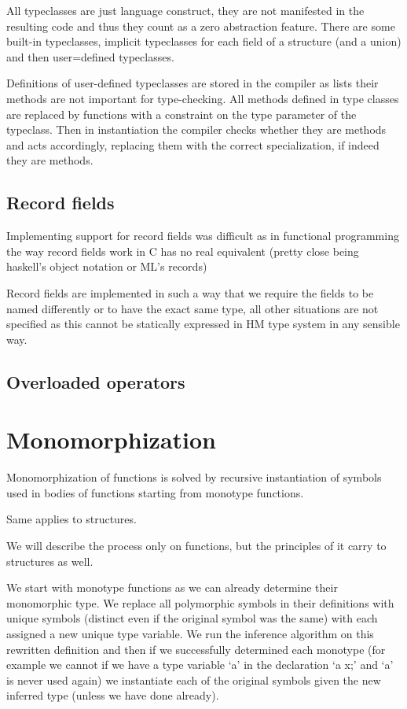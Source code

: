All typeclasses are just language construct, they are not manifested in the resulting code and thus they
count as a zero abstraction feature. There are some built-in typeclasses, %
implicit typeclasses for each field of a structure (and a union) and then user=defined typeclasses.

Definitions of user-defined typeclasses are stored in the compiler as lists their methods are not important
for type-checking. All methods defined in type classes are replaced by functions with a constraint on the type
parameter of the typeclass. Then in instantiation the compiler checks whether they are methods and acts accordingly,
replacing them with the correct specialization, if indeed they are methods.

\subsection{Record fields}

Implementing support for record fields was difficult as in functional programming the way
record fields work in C has no real equivalent (pretty close being haskell's object notation or ML's records)

Record fields are implemented in such a way that we require the fields to be named differently
or to have the exact same type, all other situations are not specified as this cannot be
statically expressed in HM type system in any sensible way.


\subsection{Overloaded operators}

\section{Monomorphization}

Monomorphization of functions is solved by recursive instantiation of symbols used in bodies of functions
starting from monotype functions.

Same applies to structures.

We will describe the process only on functions, but the principles of it carry to structures as well.

We start with monotype functions as we can already determine their monomorphic type. We replace all polymorphic
symbols in their definitions with unique symbols (distinct even if the original symbol was the same) with each
assigned a new unique type variable. We run the inference algorithm on this rewritten definition and then if
we successfully determined each monotype (for example we cannot if we have a type variable `a' in the declaration `a x;'
and `a' is never used again) we instantiate each of the original symbols given the new inferred type (unless we have done already).

